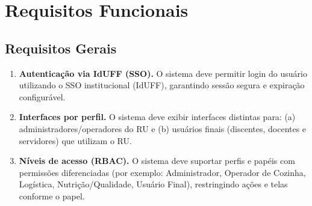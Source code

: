 \documentclass[12pt,a4paper]{article}
\begin{document}
\section{Requisitos Funcionais}

\subsection{Requisitos Gerais}
\begin{enumerate}[label=\textbf{RF-GEN-\arabic*}, leftmargin=*, align=left]
    \item \textbf{Autenticação via IdUFF (SSO).} O sistema deve permitir login do usuário utilizando o SSO institucional (IdUFF), garantindo sessão segura e expiração configurável. %

    \item \textbf{Interfaces por perfil.} O sistema deve exibir interfaces distintas para: (a) administradores/operadores do RU e (b) usuários finais (discentes, docentes e servidores) que utilizam o RU. %

    \item \textbf{Níveis de acesso (RBAC).} O sistema deve suportar perfis e papéis com permissões diferenciadas (por exemplo: Administrador, Operador de Cozinha, Logística, Nutrição/Qualidade, Usuário Final), restringindo ações e telas conforme o papel. %

    
\end{enumerate}
\end{document}
